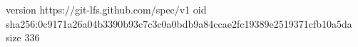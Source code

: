 version https://git-lfs.github.com/spec/v1
oid sha256:0c9171a26a04b3390b93c7c3c0a0bdb9a84ccae2fc19389e2519371cfb10a5da
size 336
